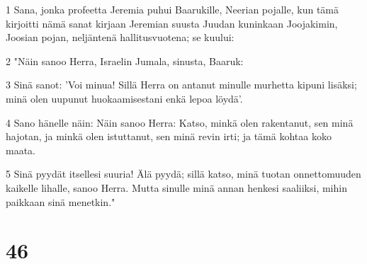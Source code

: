 \par 1 Sana, jonka profeetta Jeremia puhui Baarukille, Neerian pojalle, kun tämä kirjoitti nämä sanat kirjaan Jeremian suusta Juudan kuninkaan Joojakimin, Joosian pojan, neljäntenä hallitusvuotena; se kuului:
\par 2 "Näin sanoo Herra, Israelin Jumala, sinusta, Baaruk:
\par 3 Sinä sanot: 'Voi minua! Sillä Herra on antanut minulle murhetta kipuni lisäksi; minä olen uupunut huokaamisestani enkä lepoa löydä'.
\par 4 Sano hänelle näin: Näin sanoo Herra: Katso, minkä olen rakentanut, sen minä hajotan, ja minkä olen istuttanut, sen minä revin irti; ja tämä kohtaa koko maata.
\par 5 Sinä pyydät itsellesi suuria! Älä pyydä; sillä katso, minä tuotan onnettomuuden kaikelle lihalle, sanoo Herra. Mutta sinulle minä annan henkesi saaliiksi, mihin paikkaan sinä menetkin."

\chapter{46}

